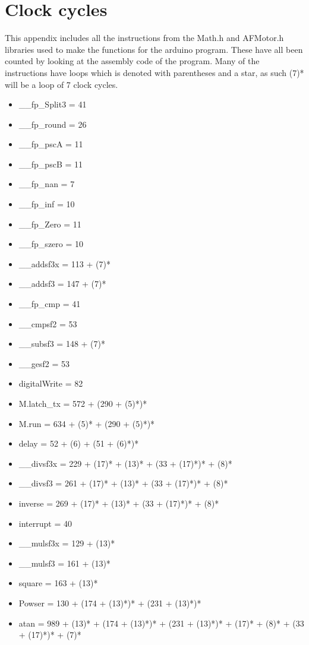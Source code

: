 \chapter{Clock cycles}
This appendix includes all the instructions from the Math.h and AFMotor.h libraries used to make the functions for the arduino program. These have all been counted by looking at the assembly code of the program. Many of the instructions have loops which is denoted with parentheses and a star, as such (7)* will be a loop of 7 clock cycles. 
\begin{itemize}
	\item \_\_fp\_Split3 = 41
	\item \_\_fp\_round = 26
	\item \_\_fp\_pscA = 11
	\item \_\_fp\_pscB = 11
	\item \_\_fp\_nan = 7
	\item \_\_fp\_inf = 10
	\item \_\_fp\_Zero = 11
	\item \_\_fp\_szero = 10
	\item \_\_addsf3x = 113 + (7)*
	\item \_\_addsf3 = 147 + (7)*
	\item \_\_fp\_cmp = 41
	\item \_\_cmpsf2 = 53
	\item \_\_subsf3 = 148 + (7)*
	\item \_\_gesf2 = 53
	\item digitalWrite = 82{\normalsize }
	\item M.latch\_tx = 572 + (290 + (5)*)*
	\item M.run = 634 + (5)* + (290 + (5)*)*
	\item delay = 52 + (6) + (51 + (6)*)*
	\item \_\_divsf3x = 229 + (17)* + (13)* + (33 + (17)*)* + (8)*
	\item \_\_divsf3 = 261 + (17)* + (13)* + (33 + (17)*)* + (8)*
	\item inverse = 269 + (17)* + (13)* + (33 + (17)*)* + (8)*
	\item interrupt = 40
	\item \_\_mulsf3x = 129 + (13)*
	\item \_\_mulsf3 = 161 + (13)*
	\item square = 163 + (13)*
	\item Powser = 130 + (174 + (13)*)* + (231 + (13)*)*
	\item atan = 989 + (13)* + (174 + (13)*)* + (231 + (13)*)* + (17)* + (8)* + (33 + (17)*)* + (7)*

\end{itemize}
